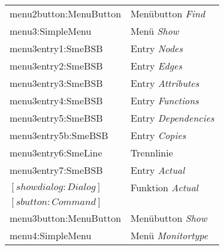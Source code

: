 \begin{tabular}{|l|l|}
\hline
\hspace{0.5cm}                menu2button:MenuButton             &     Men\"ubutton {\it Find}               \\
\hspace{0.5cm}                menu3:SimpleMenu                   &     Men\"u {\it Show}                     \\
\hspace{1.0cm}                        menu3entry1:SmeBSB         &     Entry {\it Nodes}                     \\
\hspace{1.0cm}                        menu3entry2:SmeBSB         &     Entry {\it Edges}                     \\
\hspace{1.0cm}                        menu3entry3:SmeBSB         &     Entry {\it Attributes}                \\
\hspace{1.0cm}                        menu3entry4:SmeBSB         &     Entry {\it Functions}                 \\
\hspace{1.0cm}                        menu3entry5:SmeBSB         &     Entry {\it Dependencies}              \\
\hspace{1.0cm}                        menu3entry5b:SmeBSB        &     Entry {\it Copies}                   \\
\hspace{1.0cm}                        menu3entry6:SmeLine        &     Trennlinie                        \\
\hspace{1.0cm}                        menu3entry7:SmeBSB         &     Entry {\it Actual}                    \\
\hspace{0.5cm}                $[showdialog:Dialog]$                &     Funktion {\it Actual}                 \\
\hspace{1.0cm}                        $[sbutton:Command]$          &                                     \\
\hspace{0.5cm}                menu3button:MenuButton             &     Men\"ubutton {\it Show}              \\
\hspace{0.5cm}                menu4:SimpleMenu                   &     Men\"u {\it Monitortype}             \\

\end{tabular}
